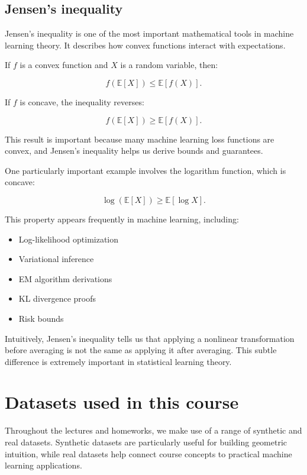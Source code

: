 \documentclass{article}
\begin{document}
\subsection{Jensen's inequality}

Jensen's inequality is one of the most important mathematical tools in machine learning theory. It describes how convex functions interact with expectations.

If $f$ is a convex function and $X$ is a random variable, then:

\[
f(\mathbb{E}[X]) \le \mathbb{E}[f(X)].
\]

If $f$ is concave, the inequality reverses:

\[
f(\mathbb{E}[X]) \ge \mathbb{E}[f(X)].
\]

This result is important because many machine learning loss functions are convex, and Jensen's inequality helps us derive bounds and guarantees.

One particularly important example involves the logarithm function, which is concave:

\[
\log(\mathbb{E}[X]) \ge \mathbb{E}[\log X].
\]

This property appears frequently in machine learning, including:

\begin{itemize}
\item Log-likelihood optimization
\item Variational inference
\item EM algorithm derivations
\item KL divergence proofs
\item Risk bounds
\end{itemize}

Intuitively, Jensen's inequality tells us that applying a nonlinear transformation before averaging is not the same as applying it after averaging. This subtle difference is extremely important in statistical learning theory.


\section{Datasets used in this course}

Throughout the lectures and homeworks, we make use of a range of synthetic and real datasets. Synthetic datasets are particularly useful for building geometric intuition, while real datasets help connect course concepts to practical machine learning applications.
\end{document}
